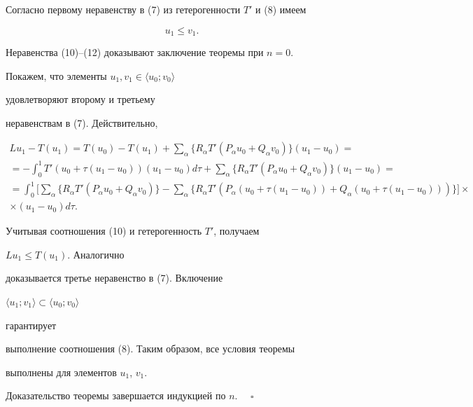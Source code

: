 Согласно первому неравенству в (7) из гетерогенности $T'$ и (8) имеем


\begin{equation}


u_1\le v_1.


\end{equation}


Неравенства (10)--(12) доказывают заключение теоремы при $n=0$.





Покажем, что элементы $u_1,v_1\in\langle u_0;v_0\rangle$


удовлетворяют второму и третьему


неравенствам в (7). Действительно,


\begin{gather*}


Lu_1-T(u_1)=T(u_0)-T(u_1)+


\sum_\alpha\{R_\alpha T'(P_\alpha u_0+Q_\alpha v_0)\}(u_1-u_0)= \\


=-\int^1_0 T'(u_0+\tau(u_1-u_0))(u_1-u_0)d\tau+


\sum_\alpha\{R_\alpha T'(P_\alpha u_0+Q_\alpha v_0)\}(u_1-u_0)=\\


=\int^1_0\biggl[\sum_\alpha\{R_\alpha T'(P_\alpha u_0+Q_\alpha v_0)\}-


\sum_\alpha\{R_\alpha T'(P_\alpha(u_0+\tau(u_1-u_0))+


Q_\alpha(u_0+\tau(u_1-u_0)))\}\biggr]\times \\


\times (u_1-u_0)d\tau.


\end{gather*}


Учитывая соотношения (10) и гетерогенность $T'$, получаем


$Lu_1\le T(u_1)$. Аналогично


доказывается третье неравенство в (7). Включение


$\langle u_1;v_1\rangle\subset\langle u_0;v_0\rangle$


гарантирует


выполнение соотношения (8). Таким образом, все условия теоремы


выполнены для элементов $u_1$, $v_1$.





Доказательство теоремы завершается индукцией по $n$. $\quad\square$






